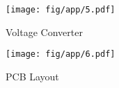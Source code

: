 \begin{figure}[h]
	\begin{center}
	\texttt{[image: fig/app/5.pdf]}
	\end{center}
	\vspace{-4mm}
	\caption[Voltage Converter]
	{Voltage Converter}
	\label{fig:app5}
	\vspace{-2mm}
\end{figure}

\begin{figure}[h]
	\begin{center}
	\texttt{[image: fig/app/6.pdf]}
	\end{center}
	\vspace{-4mm}
	\caption[PCB Layout]
	{PCB Layout}
	\label{fig:app6}
	\vspace{-2mm}
\end{figure}
%

